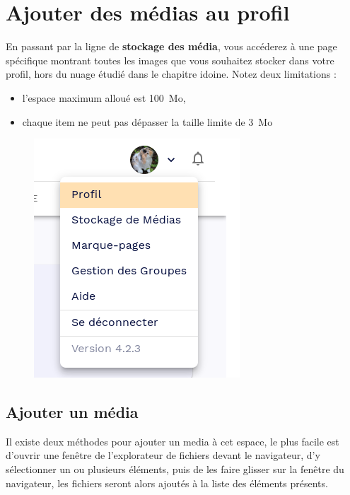 \section{Ajouter des médias au profil}
En passant par la ligne de \textbf{stockage des média}, vous accéderez à une page spécifique montrant toutes les images que vous souhaitez stocker dans votre profil, hors du nuage étudié dans le chapitre idoine. 
Notez deux limitations :
\begin{itemize}
	\item l'espace maximum alloué est 100~Mo,
	\item chaque item ne peut pas dépasser la taille limite de 3~Mo
\end{itemize}
\begin{figure}
	\centering
	\includegraphics[width=0.3333\linewidth]{./Captures/menu.profil.png}
\end{figure}

\subsection{Ajouter un média}
Il existe deux méthodes pour ajouter un media à cet espace, le plus facile est d'ouvrir une fenêtre de l'explorateur de fichiers devant le navigateur, d'y sélectionner un ou plusieurs éléments, puis de les faire glisser sur la fenêtre du navigateur, les fichiers seront alors ajoutés à la liste des éléments présents.


